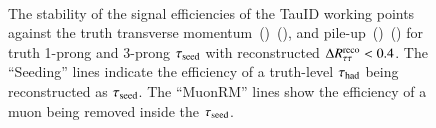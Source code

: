         \begin{figure}[hbtp]
            \begin{center}
                \vspace{-0.45cm} %
                \\
                \caption{The stability of the signal efficiencies of the TauID working points against 
                    the truth transverse momentum~(\protect{})~(\protect{}), 
                    and pile-up~(\protect{})~(\protect{}) for truth 
                    1-prong and 3-prong $\tau_\mathrm{seed}$ with reconstructed $\Delta R^\mathrm{reco}_\mathrm{\tau\tau} < 0.4$.
                    The ``Seeding'' lines indicate the efficiency 
                    of a truth-level $\tau_{\text{had}}$ being reconstructed as $\tau_\mathrm{seed}$. The ``MuonRM'' lines show the efficiency of 
                    a muon being removed inside the $\tau_\mathrm{seed}$.
                }
                \label{fig:murm:stability}
            \end{center}
        \end{figure}

